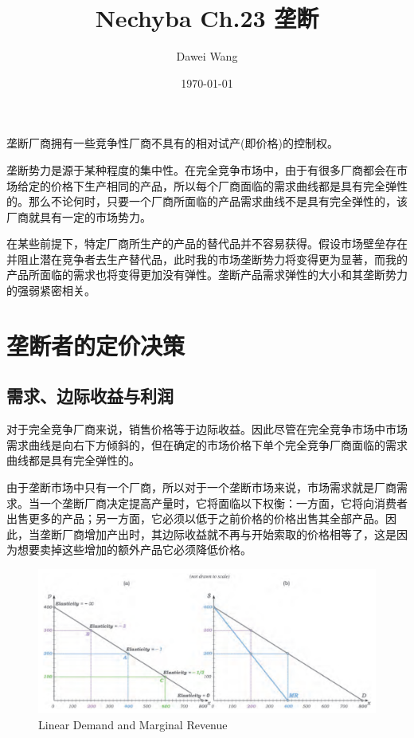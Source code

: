 \documentclass{article}
\title{Nechyba Ch.23 垄断}
\author{Dawei Wang}
\date{\today}
\begin{document}
	\maketitle
垄断厂商拥有一些竞争性厂商不具有的相对试产(即价格)的控制权。

垄断势力是源于某种程度的集中性。在完全竞争市场中，由于有很多厂商都会在市场给定的价格下生产相同的产品，所以每个厂商面临的需求曲线都是具有完全弹性的。那么不论何时，只要一个厂商所面临的产品需求曲线不是具有完全弹性的，该厂商就具有一定的市场势力。

在某些前提下，特定厂商所生产的产品的替代品并不容易获得。假设市场壁垒存在并阻止潜在竞争者去生产替代品，此时我的市场垄断势力将变得更为显著，而我的产品所面临的需求也将变得更加没有弹性。垄断产品需求弹性的大小和其垄断势力的强弱紧密相关。

\section{垄断者的定价决策}
\subsection{需求、边际收益与利润}

对于完全竞争厂商来说，销售价格等于边际收益。因此尽管在完全竞争市场中市场需求曲线是向右下方倾斜的，但在确定的市场价格下单个完全竞争厂商面临的需求曲线都是具有完全弹性的。

由于垄断市场中只有一个厂商，所以对于一个垄断市场来说，市场需求就是厂商需求。当一个垄断厂商决定提高产量时，它将面临以下权衡：一方面，它将向消费者出售更多的产品；另一方面，它必须以低于之前价格的价格出售其全部产品。因此，当垄断厂商增加产出时，其边际收益就不再与开始索取的价格相等了，这是因为想要卖掉这些增加的额外产品它必须降低价格。

\begin{figure}[H] %
	\centering %
	\includegraphics[width=1\textwidth]{23_1} %
	\caption{Linear Demand and Marginal Revenue} %
	\label{Fig.main2} %
\end{figure}
\end{document}
